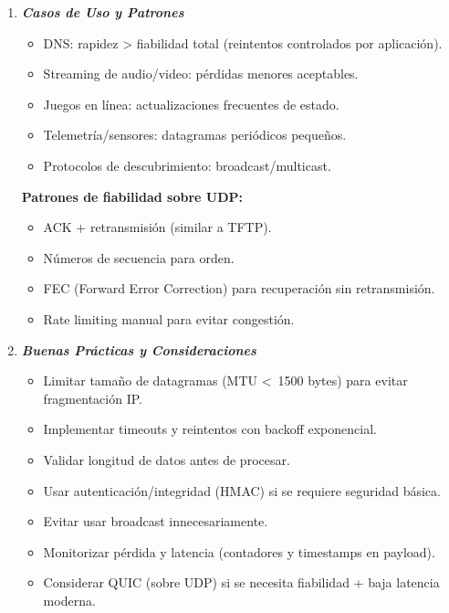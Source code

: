 \documentclass[12pt]{amsart}
\begin{document}
\begin{enumerate}
		\item \textbf{\textit{Casos de Uso y Patrones}}
		\medskip
		\begin{itemize}
		\item DNS: rapidez > fiabilidad total (reintentos controlados por aplicación).
		\item Streaming de audio/video: pérdidas menores aceptables.
		\item Juegos en línea: actualizaciones frecuentes de estado.
		\item Telemetría/sensores: datagramas periódicos pequeños.
		\item Protocolos de descubrimiento: broadcast/multicast.
		\end{itemize}

		\medskip \medskip 

		\noindent \textbf{Patrones de fiabilidad sobre UDP:}
		\medskip \medskip
		\begin{itemize}
		\item ACK + retransmisión (similar a TFTP).
		\item Números de secuencia para orden.
		\item FEC (Forward Error Correction) para recuperación sin retransmisión.
		\item Rate limiting manual para evitar congestión.
		\end{itemize}

		\bigskip \bigskip
		
		\item \textbf{\textit{Buenas Prácticas y Consideraciones}}
		\medskip
		\begin{itemize}
		\item Limitar tamaño de datagramas (MTU  \textless ~1500 bytes) para evitar fragmentación IP.
		\item Implementar timeouts y reintentos con backoff exponencial.
		\item Validar longitud de datos antes de procesar.
		\item Usar autenticación/integridad (HMAC) si se requiere seguridad básica.
		\item Evitar usar broadcast innecesariamente.
		\item Monitorizar pérdida y latencia (contadores y timestamps en payload).
		\item Considerar QUIC (sobre UDP) si se necesita fiabilidad + baja latencia moderna.
		\end{itemize}


\end{enumerate}
\end{document}
